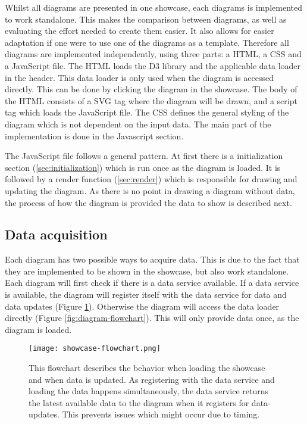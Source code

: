 Whilst all diagrams are presented in one showcase, each diagrams is implemented to work standalone. This makes the comparison between diagrams, as well as evaluating the effort needed to create them easier. It also allows for easier adaptation if one were to use one of the diagrams as a template. Therefore all diagrams are implemented independently, using three parts: a HTML, a CSS and a JavaScript file. The HTML loads the D3 library and the applicable data loader in the header. This data loader is only used when the diagram is accessed directly. This can be done by clicking the diagram in the showcase. The body of the HTML consists of a SVG tag where the diagram will be drawn, and a script tag which loads the JavaScript file. The CSS defines the general styling of the diagram which is not dependent on the input data. The main part of the implementation is done in the Javascript section.

The JavaScript file follows a general pattern. At first there is a initialization section (\ref{sec:initialization}) which is run once as the diagram is loaded. It is followed by a render function (\ref{sec:render}) which is responsible for drawing and updating the diagram. As there is no point in drawing a diagram without data, the process of how the diagram is provided the data to show is described next.

\subsection{Data acquisition} \label{sec:data-acquisition}
Each diagram has two possible ways to acquire data. This is due to the fact that they are implemented to be shown in the showcase, but also work standalone. Each diagram will first check if there is a data service available. If a data service is available, the diagram will register itself with the data service for data and data updates (Figure \ref{fig:showcase-flowchart}). Otherwise the diagram will access the data loader directly (Figure \ref{fig:diagram-flowchart}). This will only provide data once, as the diagram is loaded.

\begin{figure}[ht]
    \texttt{[image: showcase-flowchart.png]}
    \captionsetup{width=0.9\textwidth}
    \caption[showcase-flowchart]{This flowchart describes the behavior when loading the showcase and when data is updated. As registering with the data service and loading the data happens simultaneously, the data service returns the latest available data to the diagram when it registers for data-updates. This prevents issues which might occur due to timing.}
    \label{fig:showcase-flowchart}
\end{figure}

